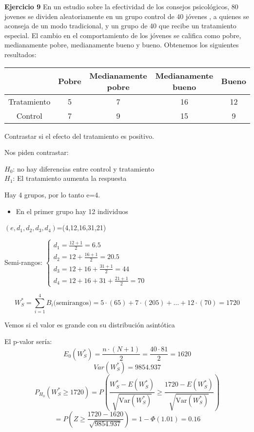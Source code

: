 \textbf{Ejercicio 9}
En un  estudio sobre la efectividad de los consejos psicológicos, 80 jovenes se dividen aleatoriamente en un grupo control de 40 jóvenes
, a quienes se aconseja de un modo tradicional, y un grupo de 40 que recibe un tratamiento especial. El cambio en el comportamiento de los jóvenes se califica como
pobre, medianamente pobre, medianamente bueno y bueno. Obtenemos los siguientes resultados:
\begin{table}[h!]
    \centering
    \begin{tabular}{|c|c|c|c|c|}
    \hline
    & Pobre & Medianamente pobre & Medianamente bueno & Bueno \\ \hline
    Tratamiento & 5 & 7 & 16 & 12 \\ \hline
    Control     & 7 & 9 & 15 & 9  \\ \hline
    \end{tabular}
\end{table}

Contrastar si el efecto del tratamiento es positivo.

Nos piden contrastar:

\begin{center}
    $H_0$: no hay diferencias entre control y tratamiento \\
    $H_1$: El tratamiento aumenta la respuesta
\end{center}

\newpage

Hay 4 grupos, por lo tanto e=4.

\begin{itemize}
    \item En el primer grupo hay 12 individuos
\end{itemize}

$(e,d_1,d_2,d_3,d_4)$=(4,12,16,31,21)

Semi-rangos:
\(
\left\{
\begin{matrix}
    d_1=\frac{12+1}{2}=6.5 \\
    d_2=12+\frac{16+1}{2}=20.5 \\
    d_3=12+16+\frac{31+1}{2}=44 \\
    d_4=12+16+31+\frac{21+1}{2}=70
\end{matrix}
\right.
\)

\[
    W_S^*=\sum_{i=1}^{4} B_i \text{(semirangos)}=5\cdot (65)+ 7\cdot (205)+ \dots+12 \cdot (70)=1720
\]

Vemos si el valor es grande con su distribución asintótica

El p-valor sería:
\[
    E_0(W_S^*) = \frac{n \cdot (N+1)}{2} = \frac{40 \cdot 81}{2} = 1620
\]
\[
    Var(W_S^*) = 9854.937
\]
\[
    P_{H_0}(W_S^* \geq 1720) = P \left( \frac{W_S^* - E(W_S^*)}{\sqrt{\text{Var}(W_S^*)}} \geq \frac{1720 - E(W_S^*)}{\sqrt{\text{Var}(W_S^*)}} \right)
\]
\[
    = P \left(Z \geq \frac{1720 - 1620}{\sqrt{9854.937}} \right) = 1 - \Phi(1.01) = 0.16
\]

